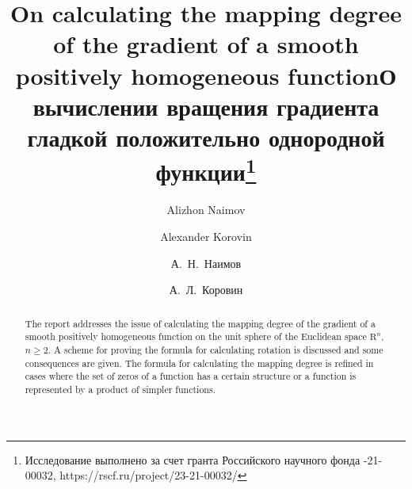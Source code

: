 \begin{englishtitle} %
\title{On calculating the mapping degree of the gradient of a smooth positively homogeneous function}
\author{Alizhon Naimov  \and  Alexander Korovin 
}

\maketitle

\begin{abstract}
The report addresses the issue of calculating the mapping degree of the gradient of a smooth positively homogeneous function on the unit sphere of the Euclidean space $\mathrm{R}^n$, $n\geq 2$. A scheme for proving the formula for calculating rotation is discussed and some consequences are given. The formula for calculating the mapping degree is refined in cases where the set of zeros of a function has a certain structure or
  a function is represented by a product of simpler functions.

\end{abstract}
\end{englishtitle}

\iffalse
\documentclass[12pt]{llncs}


\usepackage{iftex}

\ifPDFTeX
\usepackage[T2A]{fontenc}
\usepackage[utf8]{inputenc} %
\usepackage[english,russian]{babel}
\fi

\usepackage{todonotes}

\usepackage[russian]{nla}


\fi
%

\title{О вычислении вращения градиента гладкой положительно однородной функции\thanks{Исследование выполнено за счет гранта
Российского научного фонда -21-00032, https://rscf.ru/project/23-21-00032/}}
\author{А.~Н.~Наимов \and А.~Л.~Коровин
 } %

